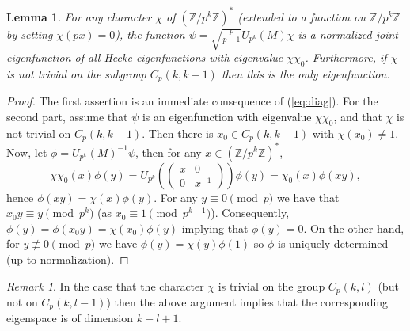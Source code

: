 \documentclass[12pt]{amsart}
\newtheorem{lem}{Lemma}[section]
\theoremstyle{definition}
\theoremstyle{remark}
\newtheorem{rem}{Remark}[section]
\numberwithin{equation}{section}
\newcommand{\bbZ}{\mathbb{Z}}
\begin{document}
\begin{lem}\label{l:eigenfunction}
For any character $\chi$ of $(\bbZ/p^k\bbZ)^*$ (extended to a
function on $\bbZ/p^k\bbZ$ by setting $\chi(px)=0$), the function
$\psi=\sqrt{\frac{p}{p-1}}U_{p^k}(M)\chi$ is a normalized joint
eigenfunction of all Hecke eigenfunctions with eigenvalue
$\chi\chi_0$. Furthermore, if $\chi$ is not trivial on the subgroup
$C_p(k,k-1)$ then this is the only eigenfunction.
\end{lem}
\begin{proof}
The first assertion is an immediate consequence of (\ref{eq:diag}).
For the second part, assume that $\psi$ is an eigenfunction with
eigenvalue $\chi\chi_0$, and that $\chi$ is not trivial on
$C_p(k,k-1)$. Then there is $x_0\in C_p(k,k-1)$ with $\chi(x_0)\neq
1$. Now, let $\phi=U_{p^k}(M)^{-1}\psi$, then for any
$x\in(\bbZ/p^k\bbZ)^*$,
\[\chi\chi_0(x)\phi(y)=U_{p^k}(\begin{pmatrix}x & 0\\ 0 & x^{-1}\end{pmatrix})\phi(y)=\chi_0(x)\phi(xy),\]
hence $\phi(xy)=\chi(x)\phi(y)$. For any $y\equiv 0\pmod{p}$ we have
that $x_0y\equiv y\pmod{p^k}$ (as $x_0\equiv 1\pmod {p^{k-1}}$).
Consequently, $\phi(y)=\phi(x_0y)=\chi(x_0)\phi(y)$ implying that
$\phi(y)=0$. On the other hand, for $y\not\equiv 0\pmod{p}$ we have
$\phi(y)=\chi(y)\phi(1)$ so $\phi$ is uniquely determined (up to
normalization).
\end{proof}

\begin{rem}
In the case that the character $\chi$ is trivial on the group
$C_p(k,l)$ (but not on $C_p(k,l-1)$) then the above argument implies
that the corresponding eigenspace is of dimension $k-l+1$.
\end{rem}
\end{document}
